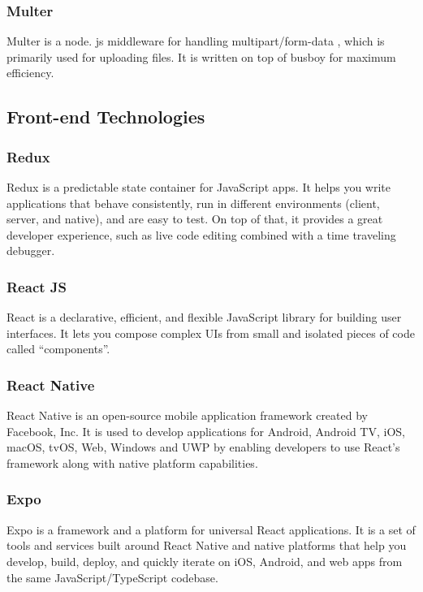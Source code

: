     \subsubsection{Multer}
    Multer is a node. js middleware for handling multipart/form-data , 
    which is primarily used for uploading files. It is written on top of busboy for maximum efficiency.

\subsection{Front-end Technologies}

    \subsubsection{Redux}
    Redux is a predictable state container for JavaScript apps.
    It helps you write applications that behave consistently, run in different environments 
    (client, server, and native), and are easy to test. On top of that, it provides a great developer experience, 
    such as live code editing combined with a time traveling debugger.
    
    \subsubsection{React JS}
    React is a declarative, efficient, and flexible JavaScript library for building user interfaces. 
    It lets you compose complex UIs from small and isolated pieces of code called “components”.

    \subsubsection{React Native}
    React Native is an open-source mobile application framework created by Facebook, Inc.
    It is used to develop applications for Android, Android TV, iOS, macOS, tvOS, Web, Windows and UWP by enabling 
    developers to use React's framework along with native platform capabilities.

    \subsubsection{Expo}
    Expo is a framework and a platform for universal React applications. 
    It is a set of tools and services built around React Native and native platforms that help you develop, build, 
    deploy, and quickly iterate on iOS, Android, and web apps from the same JavaScript/TypeScript codebase.

